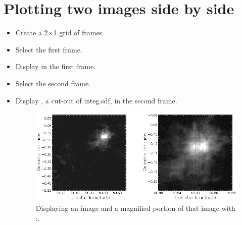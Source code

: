 \documentclass[11pt,oneside,chapters]{starlink}
\begin{document}
\section{Plotting two images side by side}

\begin{itemize}
\item Create a 2$\times$1 grid of frames.
\begin{terminalv}
\end{terminalv}
\item Select the first frame.
\begin{terminalv}
\end{terminalv}
\item Display  in the first frame.
\begin{terminalv}
\end{terminalv}


\item Select the second frame.
\begin{terminalv}
\end{terminalv}
\item Display , a cut-out of integ.sdf, in the second frame.
\begin{terminalv}
\end{terminalv}

\begin{figure}[h!]
\begin{center}
\includegraphics[width=0.8\linewidth]{sc20_display7}
\caption[Displaying an image and a magnified portion of that image with \Kappa:\display.]{\label{fig:display7}
  Displaying an image and a magnified portion of that image with \Kappa:\display.}
\end{center}
\end{figure}


\end{itemize}
\end{document}
